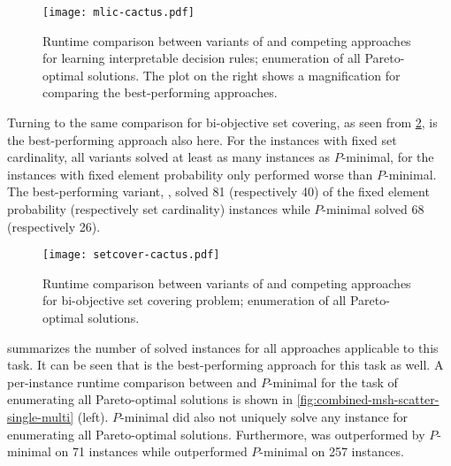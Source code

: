 \begin{figure}
  \centering
  \texttt{[image: mlic-cactus.pdf]}
  \caption{Runtime comparison between variants of \algname{} and competing approaches for learning interpretable decision rules;
    enumeration of all Pareto-optimal solutions.
    The plot on the right shows a magnification for comparing the best-performing approaches.
  }\label{fig:mlic-cactus-multi}
\end{figure}

Turning to the same comparison for bi-objective set covering, as seen from \cref{fig:setcover-cactus-multi}, \msh{} is the best-performing approach also here.
For the instances with fixed set cardinality, all \algname{} variants solved at least as many instances as $P$-minimal, for the instances with fixed element probability only \oll{} performed worse than $P$-minimal.
The best-performing variant, \msh{}, solved 81 (respectively 40) of the fixed element probability (respectively set cardinality) instances while $P$-minimal solved 68 (respectively 26).

\begin{figure}
  \centering
  \texttt{[image: setcover-cactus.pdf]}
  \caption{Runtime comparison between variants of \algname{} and competing approaches for bi-objective set covering problem;
    enumeration of all Pareto-optimal solutions.
  }\label{fig:setcover-cactus-multi}
\end{figure}

 summarizes the number of solved instances for all approaches applicable to this task.
It can be seen that \msh{} is the best-performing approach for this task as well.
A per-instance runtime comparison between \msh{} and $P$-minimal for the task of enumerating all Pareto-optimal solutions is shown in \cref{fig:combined-msh-scatter-single-multi} (left).
$P$-minimal did also not uniquely solve any instance for enumerating all Pareto-optimal solutions.
Furthermore, \msh{} was outperformed by $P$-minimal on 71 instances while \msh{} outperformed $P$-minimal on 257 instances.

